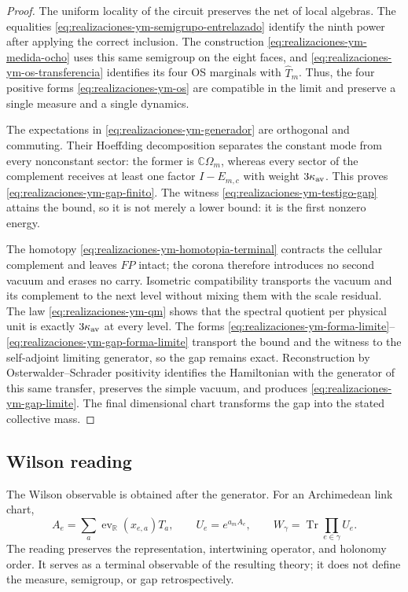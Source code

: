 \begin{proof}
The uniform locality of the circuit preserves the net of local algebras. The
equalities \eqref{eq:realizaciones-ym-semigrupo-entrelazado} identify the
ninth power after applying the correct inclusion. The construction
\eqref{eq:realizaciones-ym-medida-ocho} uses this same semigroup on the eight
faces, and \eqref{eq:realizaciones-ym-os-transferencia} identifies its four
OS marginals with \(\widehat T_m\). Thus, the four positive forms
\eqref{eq:realizaciones-ym-os} are compatible in the limit and preserve a
single measure and a single dynamics.

The expectations in \eqref{eq:realizaciones-ym-generador} are orthogonal and
commuting. Their Hoeffding decomposition separates the constant mode from every
nonconstant sector: the former is \(\mathbb C\Omega_m\), whereas every
sector of the complement receives at least one factor \(I-E_{m,c}\) with weight
\(3\kappa_{\rm av}\). This proves
\eqref{eq:realizaciones-ym-gap-finito}. The witness
\eqref{eq:realizaciones-ym-testigo-gap} attains the bound, so it is not
merely a lower bound: it is the first nonzero energy.

The homotopy \eqref{eq:realizaciones-ym-homotopia-terminal} contracts the
cellular complement and leaves \(FP\) intact; the corona therefore introduces no
second vacuum and erases no carry. Isometric compatibility transports the
vacuum and its complement to the next level without mixing them with the scale
residual. The law
\eqref{eq:realizaciones-ym-qm} shows that the spectral quotient per physical
unit is exactly \(3\kappa_{\rm av}\) at every level. The forms
\eqref{eq:realizaciones-ym-forma-limite}--
\eqref{eq:realizaciones-ym-gap-forma-limite} transport the bound and the witness
to the self-adjoint limiting generator, so the gap remains exact.
Reconstruction by Osterwalder--Schrader
positivity identifies the Hamiltonian with the generator of this
same transfer, preserves the simple vacuum, and produces
\eqref{eq:realizaciones-ym-gap-limite}. The final dimensional chart transforms
the gap into the stated collective mass.
\end{proof}



\subsection*{Wilson reading}

The Wilson observable is obtained after the generator. For an Archimedean
link chart,
\begin{equation}\label{eq:realizaciones-ym-wilson}
 A_e=\sum_a\operatorname{ev}_{\mathbb R}(x_{e,a})T_a,
 \qquad
 U_e=e^{a_mA_e},
 \qquad
 W_\gamma=\operatorname{Tr}\!\prod_{e\in\gamma}U_e.
\end{equation}
The reading preserves the representation, intertwining operator, and
holonomy order. It serves as a terminal observable of the resulting theory; it does not define
the measure, semigroup, or gap retrospectively.

